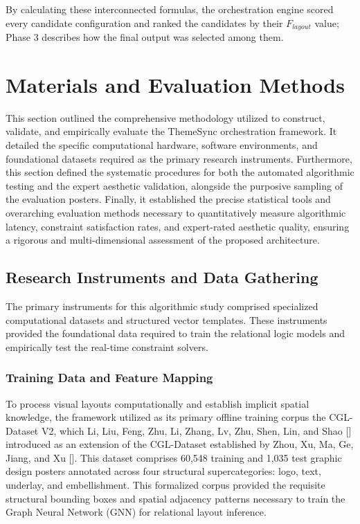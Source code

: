 \begin{refsection}
\begin{enumerate}
    By calculating these interconnected formulas, the orchestration engine scored every candidate configuration and ranked the candidates by their $F_{layout}$ value; Phase 3 describes how the final output was selected among them.

\end{enumerate}


\section{Materials and Evaluation Methods}
This section outlined the comprehensive methodology utilized to construct, validate, and empirically evaluate the ThemeSync orchestration framework. It detailed the specific computational hardware, software environments, and foundational datasets required as the primary research instruments. Furthermore, this section defined the systematic procedures for both the automated algorithmic testing and the expert aesthetic validation, alongside the purposive sampling of the evaluation posters. Finally, it established the precise statistical tools and overarching evaluation methods necessary to quantitatively measure algorithmic latency, constraint satisfaction rates, and expert-rated aesthetic quality, ensuring a rigorous and multi-dimensional assessment of the proposed architecture.

\subsection{Research Instruments and Data Gathering}
The primary instruments for this algorithmic study comprised specialized computational datasets and structured vector templates. These instruments provided the foundational data required to train the relational logic models and empirically test the real-time constraint solvers.

\subsubsection{Training Data and Feature Mapping}
To process visual layouts computationally and establish implicit spatial knowledge, the framework utilized as its primary offline training corpus the CGL-Dataset V2, which Li, Liu, Feng, Zhu, Li, Zhang, Lv, Zhu, Shen, Lin, and Shao [\citeyear{li2023radm}] introduced as an extension of the CGL-Dataset established by Zhou, Xu, Ma, Ge, Jiang, and Xu [\citeyear{zhou2022cglgan}]. This dataset comprises 60,548 training and 1,035 test graphic design posters annotated across four structural supercategories: logo, text, underlay, and embellishment. This formalized corpus provided the requisite structural bounding boxes and spatial adjacency patterns necessary to train the Graph Neural Network (GNN) for relational layout inference.


\end{refsection}
